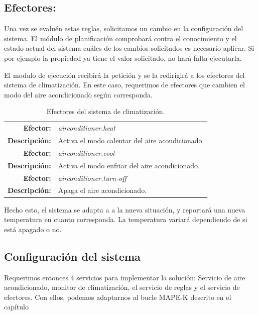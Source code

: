 \subsection{Efectores:}

Una vez se evaluén estas reglas, solicitamos un cambio en la configuración del sistema. El módulo de planificación comprobará contra el conocimiento y el estado actual del sistema cuáles de los cambios solicitados es necesario aplicar. Si por ejemplo la propiedad ya tiene el valor solicitado, no hará falta ejecutarla.

El modulo de ejecución recibirá la petición y se la redirigirá a los efectores del sistema de climatización. En este caso, requerimos de efectores que cambien el modo del aire acondicionado según corresponda.

\begin{table}[htb]
  \centering

  \begin{tabular}{|r p{11.5cm}|}
    \hline
    \textbf{Efector:} & \emph{airconditioner.heat}  \\
    \textbf{Descripción:} & Activa el modo calentar del aire acondicionado. \\
    \hline
    \textbf{Efector:} & \emph{airconditioner.cool}  \\
    \textbf{Descripción:} & Activa el modo enfriar del aire acondicionado. \\
    \hline
    \textbf{Efector:} & \emph{airconditioner.turn-off}  \\
    \textbf{Descripción:} & Apaga el aire acondicionado. \\
    \hline
  \end{tabular}

  \caption{Efectores del sistema de climatización.}
    \label{tab:climatisation-effectors}
\end{table}

Hecho esto, el sistema se adapta a a la nueva situación, y reportará una nueva temperatura en cuanto corresponda. La temperatura variará dependiendo de si está apagado o no.

\subsection{Configuración del sistema}

Requerimos entonces 4 servicios para implementar la solución: Servicio de aire acondicionado, monitor de climatización, el servicio de reglas y el servicio de efectores. Con ellos, podemos adaptarnos al bucle MAPE-K descrito en el capítulo %

